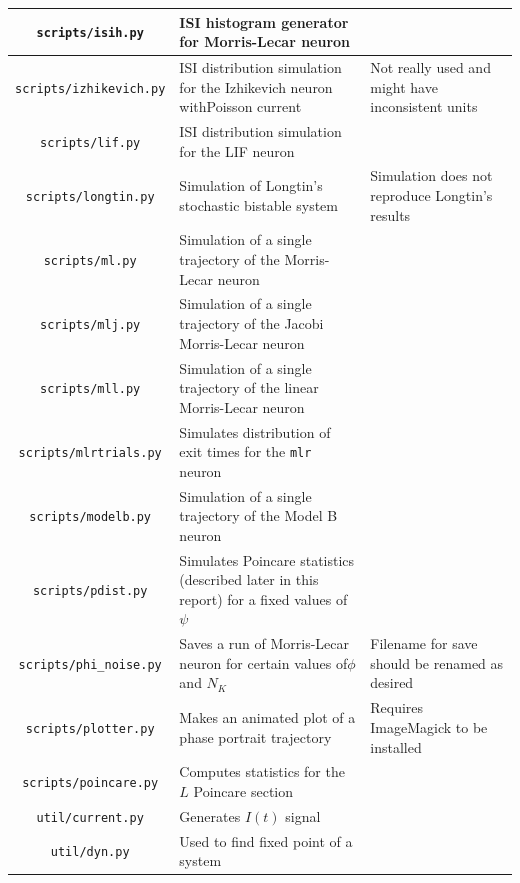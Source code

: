 \documentclass[letterpaper,12pt]{article}
\numberwithin{table}{section}
\numberwithin{figure}{section}
\numberwithin{equation}{section}
\begin{document}
\begin{flushleft}
\begin{center}
\begin{tabularx}{\linewidth}{ | c | Y | X | }
            \hline
            \texttt{scripts/isih.py} & ISI histogram generator for Morris-Lecar neuron & \\
            \hline
            \texttt{scripts/izhikevich.py} & ISI distribution simulation for the Izhikevich neuron withPoisson current & Not really used and might have inconsistent units \\
            \hline
            \texttt{scripts/lif.py} & ISI distribution simulation for the LIF neuron & \\
            \hline
            \texttt{scripts/longtin.py} & Simulation of Longtin's stochastic bistable system & Simulation does not reproduce Longtin's results \\
            \hline
            \texttt{scripts/ml.py} & Simulation of a single trajectory of the Morris-Lecar neuron & \\
            \hline
            \texttt{scripts/mlj.py} & Simulation of a single trajectory of the Jacobi Morris-Lecar neuron & \\
            \hline
            \texttt{scripts/mll.py} & Simulation of a single trajectory of the linear Morris-Lecar neuron & \\
            \hline
            \texttt{scripts/mlrtrials.py} & Simulates distribution of exit times for the \texttt{mlr} neuron & \\
            \hline
            \texttt{scripts/modelb.py} & Simulation of a single trajectory of the Model B neuron & \\
            \hline
            \texttt{scripts/pdist.py} & Simulates Poincare statistics (described later in this report) for a fixed values of $\psi$ & \\
            \hline
            \texttt{scripts/phi\_noise.py} & Saves a run of Morris-Lecar neuron for certain values of$\phi$ and $N_K$ & Filename for save should be renamed as desired \\
            \hline
            \texttt{scripts/plotter.py} & Makes an animated plot of a phase portrait trajectory & Requires ImageMagick to be installed \\
            \hline
            \texttt{scripts/poincare.py} & Computes statistics for the $L$ Poincare section & \\
            \hline
            \texttt{util/current.py} & Generates $I(t)$ signal & \\
            \hline
            \texttt{util/dyn.py} & Used to find fixed point of a system & \\

\end{tabularx}
\end{center}
\end{flushleft}
\end{document}
